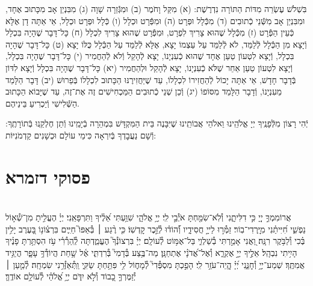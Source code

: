 \documentclass[twoside, openany, parskip=half, 11pt]{book}
\begin{document}
בִּשְׁלֹשׁ עֶשְׂרֵה מִדּוֹת הַתּוֹרָה נִדְרֶשֶׁת:\hfill \break
(א) מִקַּל וָחֹמֶר (ב) וּמִגְּֿֿזֵרָה שָׁוָה (ג) מִבִּנְיַן אָב מִכָּתוּב אֶחָד, וּמִבִּנְיַן אָב מִשְּֿֿׁנֵי כְֿתוּבִים (ד) מִכְּֿֿלָל וּפְרָט (ה) וּמִפְּֿֿרָט וּכְלָל (ו) כְּֿלָל וּפְרָט וּכְלָל, אֵי אַתָּה דָן אֶלָּא כְּֿעֵין הַפְּֿֿרָט (ז) מִכְּֿֿלָל שֶׁהוּא צָרִיךְ לִפְרָט, וּמִפְּֿֿרָט שֶׁהוּא צָרִיךְ לִכְלָל (ח) כָּל־דָּבָר שֶׁהָיָה בִּכְלָל וְֿיָצָא מִן הַכְּֿֿלָל לְֿלַמֵּד, לֹא לְֿלַמֵּד עַל עַצְמוֹ יָצָא, אֶלָּא לְֿלַמֵּד עַל הַכְּֿֿלָל כֻּלּוֹ יָצָא (ט) כָּל־דָּבָר שֶׁהָיָה בִּכְלָל, וְֿיָצָא לִטְעוֹן טַעַן אֶחָד שֶׁהוּא כְֿעִנְיָנוֹ, יָצָא לְֿהָקֵל וְֿלֹא לְֿהַחֲמִיר (י) כָּל־דָּבָר שֶׁהָיָה בִּכְלָל, וְֿיָצָא לִטְעוֹן טַעַן אַחֵר שֶׁלֹּא כְֿעִנְיָנוֹ, יָצָא לְֿהָקֵל וּלְהַחֲמִיר (יא) כָּל־דָּבָר שֶׁהָיָה בִּכְלָל וְֿיָצָא לִדּוֹן בְּֿדָבָר חָדָשׁ, אֵי אַתָּה יָכוֹל לְֿהַחֲזִירוֹ לִכְלָלוֹ, עַד שֶׁיַּחֲזִירֶנּוּ הַכָּתוּב לִכְלָלוֹ בְּֿפֵרוּשׁ (יב) דָּבָר הַלָּמֵד מֵעִנְיָנוֹ, וְֿדָבָר הַלָּמֵד מִסּוֹפוֹ (יג) וְֿכֵן שְׁנֵי כְֿתוּבִים הַמַּכְחִישִׁים זֶה אֶת־זֶה, עַד שֶׁיָּבוֹא הַכָּתוּב הַשְּֿֿׁלִישִׁי וְֿיַכְרִיעַ בֵּינֵיהֶם.

יְֿהִי רָצוֹן מִלְּֿפָנֶֽיךָ יְיָ אֱלֹהֵֽינוּ וֵאלֹהֵי אֲבוֹתֵֽינוּ שֶׁיִּבָּנֶה בֵּית הַמִּקְדָּשׁ בִּמְהֵרָה בְֿיָמֵֽינוּ וְֿתֵן חֶלְקֵֽנוּ בְּֿתוֹרָתֶֽךָ: וְֿשָׁם נַעֲבׇדְךָ בְּֿיִרְאָה כִּימֵי עוֹלָם וּכְשָׁנִים קַדְמֹנִיּוֹת:


\rabbiskaddish

\chapter[פסוקי דזמרא]{ פסוקי דזמרא }
  \\
אֲרוֹמִמְךָ֣ יְיָ֭ כִּ֣י דִלִּיתָ֑נִי וְ֯לֹֽא־שִׂמַּ֖חְתָּ אֹיְ֯בַ֣י לִֽי׃
יְיָ֥ אֱלֹהָ֑י \hfill שִׁוַּ֥עְתִּי אֵ֝לֶ֗יךָ וַתִּרְפָּאֵֽנִי׃
יְיָ֗ הֶעֱלִ֣יתָ מִן־שְׁ֯א֣וֹל נַפְשִׁ֑י חִ֝יִּיתַ֗נִי מִיׇּֽרְדִי־בֽוֹר׃
זַמְּ֯ר֣וּ לַייָ֣ חֲסִידָ֑יו וְ֯֝הוֹד֗וּ לְ֯זֵ֣כֶר קׇדְשֽׁוֹ׃
כִּ֤י רֶ֨גַע ׀ בְּ֯אַפּוֹ֮ חַיִּ֢ים בִּרְצ֫וֹנ֥וֹ
בָּ֭עֶרֶב יָלִ֥ין בֶּ֗כִי וְ֯לַבֹּ֥קֶר רִנָּֽה׃
וַ֭אֲנִי אָמַ֣רְתִּי בְ֯שַׁלְוִ֑י בַּל־אֶמּ֥וֹט לְ֯עוֹלָֽם׃
יְיָ֗ בִּרְצוֹנְ֯ךָ֮ הֶעֱמַ֢דְתָּה לְֽ֯הַרְ֯רִ֫י עֹ֥ז הִסְתַּ֥רְתָּ פָנֶ֗יךָ הָיִ֥יתִי נִבְהָֽל׃ 
אֵלֶ֣יךָ יְיָ֣ אֶקְרָ֑א וְ֯אֶל־אֲ֝דֹנָ֗י אֶתְחַנָּֽן׃  
מַה־בֶּ֥צַע בְּ֯דָמִי֮ בְּ֯רִדְתִּ֢י אֶ֫ל שָׁ֥חַת הֲיוֹדְ֯ךָ֥ עָפָ֑ר הֲיַגִּ֥יד אֲמִתֶּֽךָ׃ 
שְׁמַע־יְיָ֥ וְ֯חׇנֵּ֑נִי יְ֝יָ֗ הֱֽיֵה־עֹזֵ֥ר לִֽי׃
הָפַ֣כְתָּ מִסְפְּ֯דִי֮ לְ֯מָח֢וֹל לִ֥י פִּתַּ֥חְתָּ שַׂקִּ֑י וַֽתְּ֯אַזְּ֯רֵ֥נִי שִׂמְחָֽה׃
לְ֯מַ֤עַן ׀ יְ֯זַמֶּרְךָ֣ כָ֭בוֹד וְ֯לֹ֣א יִדֹּ֑ם יְיָ֥ אֱ֝לֹהַ֗י לְ֯עוֹלָ֥ם אוֹדֶֽךָּ׃\\
\mournerskaddish
\end{document}
